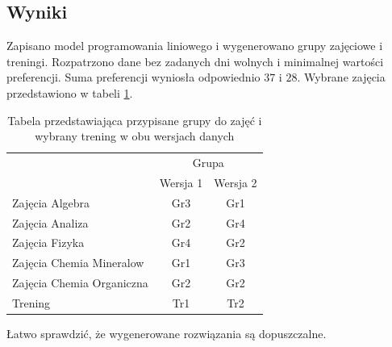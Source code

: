 \documentclass{article}
\begin{document}
\subsection{Wyniki}
Zapisano model programowania liniowego i wygenerowano grupy zajęciowe i treningi. 
Rozpatrzono dane bez zadanych dni wolnych i minimalnej wartości preferencji. Suma preferencji wyniosła odpowiednio $37$ i $28$. Wybrane zajęcia przedstawiono w tabeli \ref{tab:zajecia_trening}.
\begin{table}[h]
    \centering
    \begin{tabular}{lcc}
        & \multicolumn{2}{c}{Grupa} \\
        & Wersja 1 & Wersja 2 \\
        \hline
        Zajęcia Algebra & Gr3 & Gr1 \\
        Zajęcia Analiza & Gr2 & Gr4 \\
        Zajęcia Fizyka & Gr4 & Gr2 \\
        Zajęcia Chemia Mineralow & Gr1 & Gr3 \\
        Zajęcia Chemia Organiczna & Gr2 & Gr2 \\
        Trening & Tr1 & Tr2 \\
    \end{tabular}
    \caption{Tabela przedstawiająca przypisane grupy do zajęć i wybrany trening w obu wersjach danych}
    \label{tab:zajecia_trening}
\end{table}

Łatwo sprawdzić, że wygenerowane rozwiązania są dopuszczalne.
\end{document}

